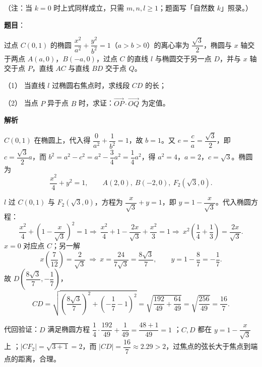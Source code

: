 \begin{answer}
（注：当 $k=0$ 时上式同样成立，只需 $m,n,l\geqslant1$；题面写「自然数 $k$」照录。）



\end{answer}
\begin{answer}

\textbf{题目}：

过点 $C(0,1)$ 的椭圆 $\dfrac{x^2}{a^2}+\dfrac{y^2}{b^2}=1$（$a>b>0$）的离心率为 $\dfrac{\sqrt3}{2}$，椭圆与 $x$ 轴交于两点 $A(a,0)$，$B(-a,0)$，过点 $C$ 的直线 $l$ 与椭圆交于另一点 $D$，并与 $x$ 轴交于点 $P$，直线 $AC$ 与直线 $BD$ 交于点 $Q$。

（1） 当直线 $l$ 过椭圆右焦点时，求线段 $CD$ 的长；

（2） 当点 $P$ 异于点 $B$ 时，求证：$\overrightarrow{OP}\cdot\overrightarrow{OQ}$ 为定值。
\nopagebreak[4]
\begin{center}\end{center}
\nopagebreak[4]
\textbf{解析}

$C(0,1)$ 在椭圆上，代入得 $\dfrac{0}{a^2}+\dfrac{1}{b^2}=1$，故 $b=1$。又 $e=\dfrac ca=\dfrac{\sqrt3}{2}$，即 $c=\dfrac{\sqrt3}{2}a$，而 $b^2=a^2-c^2=a^2-\dfrac34a^2=\dfrac14a^2$，得 $a^2=4$，$a=2$，$c=\sqrt3$。椭圆为
\nopagebreak[4]
\[
\frac{x^2}{4}+y^2=1,\qquad A(2,0),\ B(-2,0),\ F_2(\sqrt3,0).
\]


$l$ 过 $C(0,1)$ 与 $F_2(\sqrt3,0)$，方程为 $\dfrac{x}{\sqrt3}+y=1$，即 $y=1-\dfrac{x}{\sqrt3}$。代入椭圆方程：
\nopagebreak[4]
\[
\frac{x^2}{4}+\left(1-\frac{x}{\sqrt3}\right)^2=1
\Longrightarrow\ \frac{x^2}{4}+1-\frac{2x}{\sqrt3}+\frac{x^2}{3}=1
\Longrightarrow\ x^2\left(\frac14+\frac13\right)=\frac{2x}{\sqrt3}.
\]
$x=0$ 对应点 $C$；另一解
\nopagebreak[4]
\[
x\left(\frac{7}{12}\right)=\frac{2}{\sqrt3}\ \Longrightarrow\ x=\frac{24}{7\sqrt3}=\frac{8\sqrt3}{7},\qquad y=1-\frac{8}{7}=-\frac17.
\]
故 $D\left(\dfrac{8\sqrt3}{7},-\dfrac17\right)$，
\nopagebreak[4]
\[
CD=\sqrt{\left(\frac{8\sqrt3}{7}\right)^2+\left(-\frac17-1\right)^2}
=\sqrt{\frac{192}{49}+\frac{64}{49}}=\sqrt{\frac{256}{49}}=\frac{16}{7}.
\]

代回验证：$D$ 满足椭圆方程 $\dfrac{1}{4}\cdot\dfrac{192}{49}+\dfrac{1}{49}=\dfrac{48+1}{49}=1$ ；$C,D$ 都在 $y=1-\dfrac{x}{\sqrt3}$ 上 ；$|CF_2|=\sqrt{3+1}=2$，而 $|CD|=\dfrac{16}{7}\approx2.29>2$，过焦点的弦长大于焦点到端点的距离，合理。


\end{answer}
